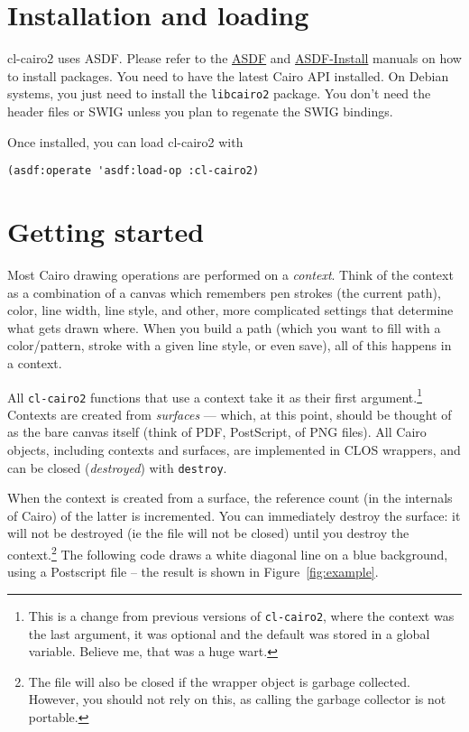 \documentclass[12pt,letterpaper]{article}
\begin{document}
\section{Installation and loading}
\label{sec:installation-loading}

cl-cairo2 uses ASDF.  Please refer to the
\href{http://www.cliki.net/asdf}{ASDF} and
\href{http://www.cliki.net/ASDF-Install}{ASDF-Install} manuals on how
to install packages.  You need to have the latest Cairo API installed.
On Debian systems, you just need to install the \verb!libcairo2!
package.  You don't need the header files or SWIG unless you plan to
regenate the SWIG bindings.

Once installed, you can load cl-cairo2 with
\begin{lstlisting}
(asdf:operate 'asdf:load-op :cl-cairo2)
\end{lstlisting}

\section{Getting started}
\label{sec:getting-started}


Most Cairo drawing operations are performed on a \emph{context}.
Think of the context as a combination of a canvas which remembers pen
strokes (the current path), color, line width, line style, and other,
more complicated settings that determine what gets drawn where.  When
you build a path (which you want to fill with a color/pattern, stroke
with a given line style, or even save), all of this happens in a
context.

All \verb!cl-cairo2! functions that use a context take it as their
first argument.\footnote{This is a change from previous versions of
  \texttt{cl-cairo2}, where the context was the last argument, it was
  optional and the default was stored in a global variable.  Believe
  me, that was a huge wart.}  Contexts are created from
\emph{surfaces} --- which, at this point, should be thought of as the
bare canvas itself (think of PDF, PostScript, of PNG files). All Cairo
objects, including contexts and surfaces, are implemented in CLOS
wrappers, and can be closed (\emph{destroyed}) with
\lstinline!destroy!.

When the context is created from a surface, the reference count (in
the internals of Cairo) of the latter is incremented.  You can
immediately destroy the surface: it will not be destroyed (ie the file
will not be closed) until you destroy the context.\footnote{The file
  will also be closed if the wrapper object is garbage collected.
  However, you should not rely on this, as calling the garbage
  collector is not portable.}  The following code draws a white
diagonal line on a blue background, using a Postscript file -- the
result is shown in Figure~\ref{fig:example}.
\end{document}
